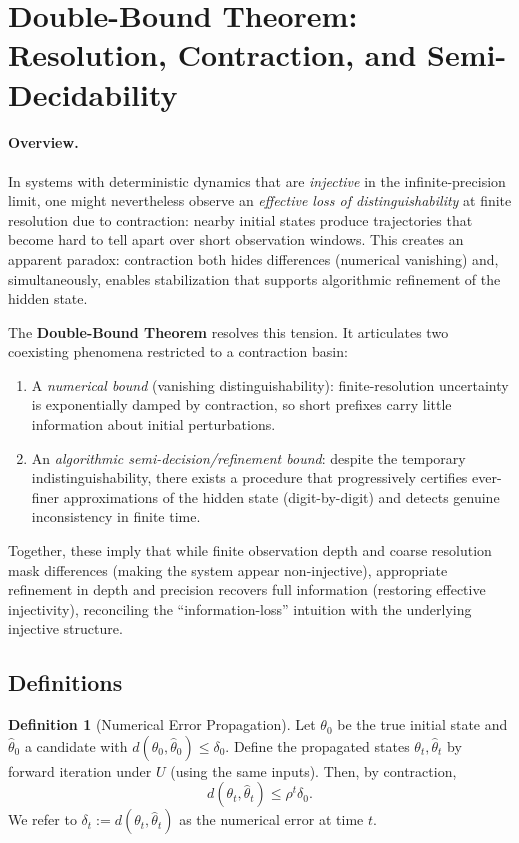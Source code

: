\documentclass[12pt]{article}
\theoremstyle{definition}
\newtheorem{definition}{Definition}[section]
\theoremstyle{plain}
\begin{document}
\section{Double-Bound Theorem: Resolution, Contraction, and Semi-Decidability}

\paragraph{Overview.} 
In systems with deterministic dynamics that are \emph{injective} in the infinite-precision limit, one might nevertheless observe an \emph{effective loss of distinguishability} at finite resolution due to contraction: nearby initial states produce trajectories that become hard to tell apart over short observation windows. This creates an apparent paradox: contraction both hides differences (numerical vanishing) and, simultaneously, enables stabilization that supports algorithmic refinement of the hidden state. 

The \textbf{Double-Bound Theorem} resolves this tension. It articulates two coexisting phenomena restricted to a contraction basin:
\begin{enumerate}
  \item A \emph{numerical bound} (vanishing distinguishability): finite-resolution uncertainty is exponentially damped by contraction, so short prefixes carry little information about initial perturbations.  
  \item An \emph{algorithmic semi-decision/refinement bound}: despite the temporary indistinguishability, there exists a procedure that progressively certifies ever-finer approximations of the hidden state (digit-by-digit) and detects genuine inconsistency in finite time.  
\end{enumerate}

Together, these imply that while finite observation depth and coarse resolution mask differences (making the system appear non-injective), appropriate refinement in depth and precision recovers full information (restoring effective injectivity), reconciling the ``information-loss'' intuition with the underlying injective structure.


\subsection{Definitions}

\begin{definition}[Numerical Error Propagation]
Let \(\theta_0\) be the true initial state and \(\widehat\theta_0\) a candidate with \(d(\theta_0,\widehat\theta_0)\le \delta_0\). Define the propagated states \(\theta_t,\widehat\theta_t\) by forward iteration under \(U\) (using the same inputs). Then, by contraction, 
\[
d(\theta_t,\widehat\theta_t) \le \rho^t \delta_0.
\]
We refer to \(\delta_t := d(\theta_t,\widehat\theta_t)\) as the numerical error at time \(t\).
\end{definition}
\end{document}
